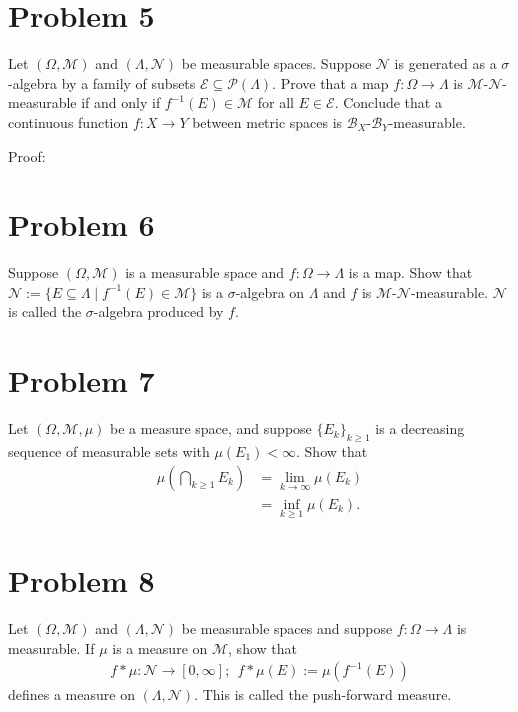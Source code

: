 \documentclass[10pt]{extarticle}
\begin{document}
  \section{Problem 5}%
  Let $(\Omega,\mathcal{M})$ and $(\Lambda,\mathcal{N})$ be measurable spaces. Suppose $\mathcal{N}$ is generated as a $\sigma$-algebra by a family of subsets $\mathcal{E}\subseteq \mathcal{P}(\Lambda)$. Prove that a map $f:\Omega \rightarrow \Lambda$ is $\mathcal{M}$-$\mathcal{N}$-measurable if and only if $f^{-1}(E)\in \mathcal{M}$ for all $E\in \mathcal{E}$. Conclude that a continuous function $f: X\rightarrow Y$ between metric spaces is $\mathcal{B}_{X}$-$\mathcal{B}_{Y}$-measurable.
  \begin{description}
    \item[Proof:] 
  \end{description}
  \section{Problem 6}%
  Suppose $(\Omega,\mathcal{M})$ is a measurable space and $f: \Omega \rightarrow \Lambda$ is a map. Show that $\mathcal{N}:= \{E\subseteq \Lambda\mid f^{-1}(E)\in \mathcal{M}\}$ is a $\sigma$-algebra on $\Lambda$ and $f$ is $\mathcal{M}$-$\mathcal{N}$-measurable. $\mathcal{N}$ is called the $\sigma$-algebra produced by $f$.
  \section{Problem 7}%
  Let $(\Omega,\mathcal{M},\mu)$ be a measure space, and suppose $\{E_k\}_{k\geq 1}$ is a decreasing sequence of measurable sets with $\mu(E_1) < \infty$. Show that
  \begin{align*}
    \mu\left(\bigcap_{k\geq 1}E_k\right) &= \lim_{k\rightarrow\infty}\mu(E_k)\\
                                         &= \inf_{k\geq 1}\mu(E_k).
  \end{align*}
  \section{Problem 8}%
  Let $(\Omega,\mathcal{M})$ and $(\Lambda,\mathcal{N})$ be measurable spaces and suppose $f: \Omega \rightarrow \Lambda$ is measurable. If $\mu$ is a measure on $\mathcal{M}$, show that
  \begin{align*}
    f\ast \mu: \mathcal{N}\rightarrow [0,\infty];~~f\ast \mu(E) := \mu(f^{-1}(E))
  \end{align*}
  defines a measure on $(\Lambda,\mathcal{N})$. This is called the push-forward measure.
\end{document}
